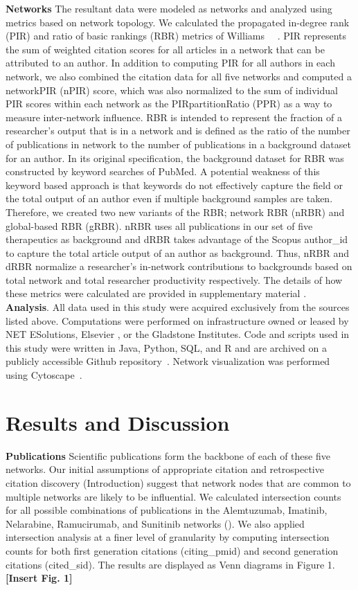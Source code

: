 \documentclass[10pt,letterpaper]{article}
\begin{document}
\textbf{Networks} The resultant data were modeled as networks and analyzed using metrics based on network topology. We calculated the propagated in-degree rank (PIR) and ratio of basic rankings (RBR) metrics of Williams ~~\cite{bibWilliams}. PIR represents the sum of weighted citation scores for all articles in a network that can be attributed to an author. In addition to computing PIR for all authors in each network, we also combined the citation data for all five networks and computed a networkPIR (nPIR) score, which was also normalized to the sum of individual PIR scores within each network as the PIRpartitionRatio (PPR) as a way to measure inter-network influence. RBR is intended to represent the fraction of a researcher's output that is in a network and is defined as the ratio of the number of publications in network to the number of publications in a background dataset for an author. In its original specification, the background dataset for RBR was constructed by keyword searches of PubMed. A potential weakness of this keyword based approach is that keywords do not effectively capture the field or the total output of an author even if multiple background samples are taken. Therefore, we created two new variants of the RBR; network RBR (nRBR) and global-based RBR (gRBR). nRBR uses all publications in our set of five therapeutics as background and dRBR takes advantage of the Scopus author\_id to capture the total article output of an author as background. Thus, nRBR and dRBR normalize a researcher's in-network contributions to backgrounds based on total network and total researcher productivity respectively. The details of how these metrics were calculated are provided in supplementary material .\\

\textbf{Analysis}. All data used in this study were acquired exclusively from the sources listed above. Computations were performed on infrastructure owned or leased by NET ESolutions, Elsevier , or the Gladstone Institutes. Code and scripts used in this study were written in Java, Python, SQL, and R and are archived on a publicly accessible Github repository~\cite{bibGithub}.  Network visualization was performed using Cytoscape~\cite{bibCytoscape}.
\section*{Results and Discussion} 

\textbf{Publications} Scientific publications form the backbone of each of these five networks. Our initial assumptions of appropriate citation and retrospective citation discovery (Introduction) suggest that network nodes that are common to multiple networks are likely to be influential. We calculated intersection counts for all possible combinations of publications in the Alemtuzumab, Imatinib, Nelarabine, Ramucirumab, and Sunitinib networks (). We also applied intersection analysis at a finer level of granularity by computing intersection counts for both first generation citations (citing\_pmid) and second generation citations (cited\_sid). The results are displayed as Venn diagrams in Figure 1. \textbf{[Insert Fig. 1]}
\end{document}
